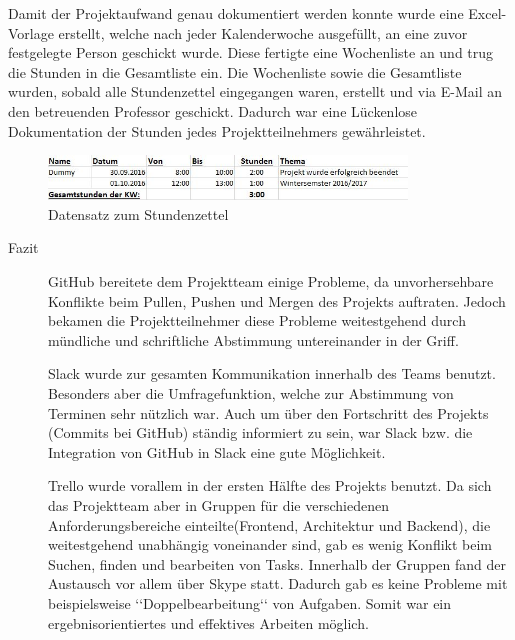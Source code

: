 Damit der Projektaufwand genau dokumentiert werden konnte wurde eine Excel-Vorlage erstellt, welche nach jeder Kalenderwoche ausgefüllt, an eine zuvor festgelegte Person geschickt wurde. Diese fertigte eine Wochenliste an und trug die Stunden in die Gesamtliste ein. Die Wochenliste sowie die Gesamtliste wurden, sobald alle Stundenzettel eingegangen waren, erstellt und via E-Mail an den betreuenden Professor geschickt. Dadurch war eine Lückenlose Dokumentation der Stunden jedes Projektteilnehmers gewährleistet.

\begin{figure}[!h]
    \centering
    \includegraphics[width=0.85\textwidth]{Graphics/stundenzettel}
    \caption{Datensatz zum Stundenzettel}
   \label{fig:stundenzettel}
\end{figure}
 
\begin{description}	
\item [Fazit] GitHub bereitete dem Projektteam einige Probleme, da unvorhersehbare Konflikte beim Pullen, Pushen und Mergen des Projekts auftraten. Jedoch bekamen die Projektteilnehmer diese Probleme weitestgehend durch mündliche und schriftliche Abstimmung untereinander in der Griff. 

Slack wurde zur gesamten Kommunikation innerhalb des Teams benutzt. Besonders aber die Umfragefunktion, welche zur Abstimmung von Terminen sehr nützlich war. Auch um über den Fortschritt des Projekts (Commits bei GitHub) ständig informiert zu sein, war Slack bzw. die Integration von GitHub in Slack eine gute Möglichkeit. 

Trello wurde vorallem in der ersten Hälfte des Projekts benutzt. Da sich das Projektteam aber in  Gruppen für die verschiedenen Anforderungsbereiche einteilte(Frontend, Architektur und Backend), die weitestgehend unabhängig voneinander sind, gab es wenig Konflikt beim Suchen, finden und bearbeiten von Tasks. Innerhalb der Gruppen fand der Austausch vor allem über Skype statt. Dadurch gab es keine Probleme mit beispielsweise ‘‘Doppelbearbeitung‘‘ von Aufgaben. Somit war ein ergebnisorientiertes und effektives Arbeiten möglich. 
\end{description}


